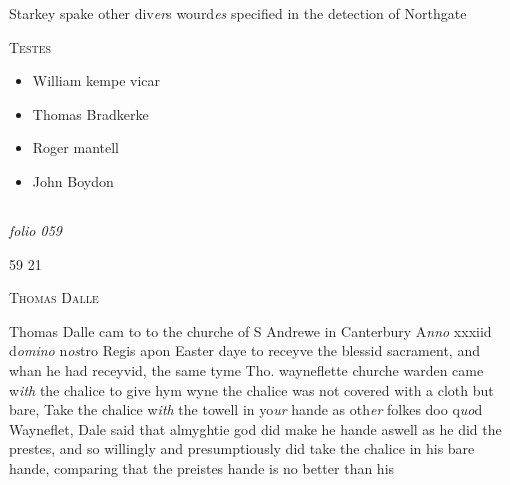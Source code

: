 \documentclass[12pt, a4paper]{book}
\begin{document}
		\ifthenelse{\isodd{\thepage}}
		{\reversemarginpar}
		{\normalmarginpar}
		Starkey spake other div\textit{er}s wourd\textit{es} specified in the
 detection of Northgate
\begin{center} {\scshape Testes} \end{center}\begin{itemize}
	
 \item[]William kempe vicar
	\item[]Thomas Bradkerke
               	\item[]Roger mantell
               		\item[]John Boydon\end{itemize}


               

\dotfill
					  \subsection*{}

\textit{folio 059}


\begin{flushright}{\color{Mahogany}59} 21\end{flushright}
 

	
				\begin{center}  {\scshape Thomas Dalle}  \end{center}
			
	
		
				\marginpar[\vspace{0.5cm}{\textcolor{Gray}{offensive}}]{}
			
		
		\ifthenelse{\isodd{\thepage}}
		{\reversemarginpar}
		{\normalmarginpar}
		Thomas Dalle cam to to the churche of S Andrewe
			in Canterbury A\textit{nno} xxxiid d\textit{omino} n\textit{os}tro Regis apon Easter
 daye to receyve the blessid sacrament, and whan
  he had receyvid, the same tyme Tho. wayneflette
  	churche warden came w\textit{ith} the chalice to give hym wyne
 the chalice was not covered with a cloth but bare, Take
 the chalice w\textit{ith} the towell in yo\textit{ur} hande as oth\textit{er} folkes doo
			q\textit{uo}d Wayneflet, Dale said that almyghtie god did make
 he hande aswell as he did the prestes, and so willingly
 and presumptiously did take the chalice in his bare
 hande, comparing that the preistes hande is no better
		 than his
	
\end{document}
